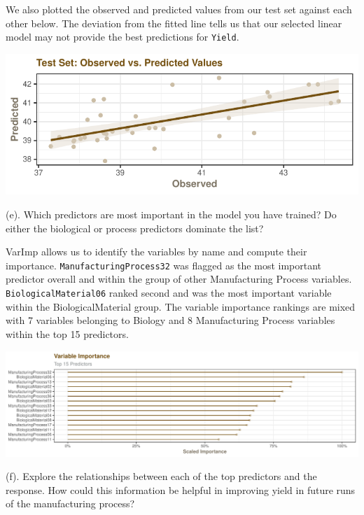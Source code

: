 \documentclass[]{report}
\begin{document}
We also plotted the observed and predicted values from our test set
against each other below. The deviation from the fitted line tells us
that our selected linear model may not provide the best predictions for
\texttt{Yield}.

\begin{center}\includegraphics{Homework-Two_files/figure-latex/kj-6.3d-2-1} \end{center}

\begin{subquestion}{(e).} Which predictors are most important in the model you have trained? Do either the biological or process predictors dominate the list? 
\end{subquestion}

VarImp allows us to identify the variables by name and compute their
importance. \texttt{ManufacturingProcess32} was flagged as the most
important predictor overall and within the group of other Manufacturing
Process variables. \texttt{BiologicalMaterial06} ranked second and was
the most important variable within the BiologicalMaterial group. The
variable importance rankings are mixed with 7 variables belonging to
Biology and 8 Manufacturing Process variables within the top 15
predictors.

\includegraphics{Homework-Two_files/figure-latex/kj-6.3e-1.pdf}

\begin{subquestion}{(f).} Explore the relationships between each of the top predictors and the response. How could this information be helpful in improving yield in future runs of the manufacturing process?
\end{subquestion}
\end{document}
